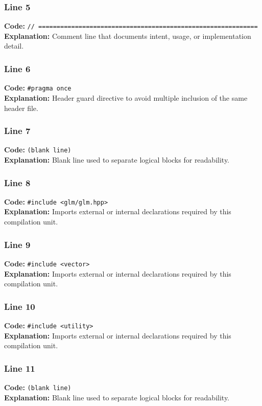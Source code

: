 \documentclass[11pt,a4paper]{article}
\begin{document}
\subsubsection*{Line 5}
\textbf{Code:} \verb|// ============================================================|\\
\textbf{Explanation:} Comment line that documents intent, usage, or implementation detail.

\subsubsection*{Line 6}
\textbf{Code:} \verb|#pragma once|\\
\textbf{Explanation:} Header guard directive to avoid multiple inclusion of the same header file.

\subsubsection*{Line 7}
\textbf{Code:} \texttt{(blank line)}\\
\textbf{Explanation:} Blank line used to separate logical blocks for readability.

\subsubsection*{Line 8}
\textbf{Code:} \verb|#include <glm/glm.hpp>|\\
\textbf{Explanation:} Imports external or internal declarations required by this compilation unit.

\subsubsection*{Line 9}
\textbf{Code:} \verb|#include <vector>|\\
\textbf{Explanation:} Imports external or internal declarations required by this compilation unit.

\subsubsection*{Line 10}
\textbf{Code:} \verb|#include <utility>|\\
\textbf{Explanation:} Imports external or internal declarations required by this compilation unit.

\subsubsection*{Line 11}
\textbf{Code:} \texttt{(blank line)}\\
\textbf{Explanation:} Blank line used to separate logical blocks for readability.
\end{document}
